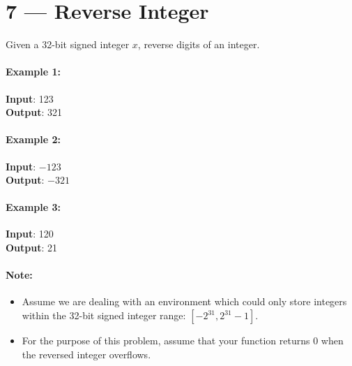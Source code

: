 \section{7 --- Reverse Integer}
Given a 32-bit signed integer $x$, reverse digits of an integer.

\paragraph{Example 1:}

\begin{flushleft}
	\textbf{Input}: 123
	\\
\textbf{Output}: 321
\end{flushleft}

\paragraph{Example 2:}

\begin{flushleft}
	\textbf{Input}: $-123$
	\\
\textbf{Output}: $-321$
\end{flushleft}

\paragraph{Example 3:}

\begin{flushleft}
	\textbf{Input}: 120
	\\
\textbf{Output}: 21
\end{flushleft}

\paragraph{Note:}
\begin{itemize}
	\item Assume we are dealing with an environment which could only store integers within the 32-bit signed integer range: $[−2^{31},  2^{31} − 1]$. 
	\item For the purpose of this problem, assume that your function returns 0 when the reversed integer overflows.
\end{itemize}

